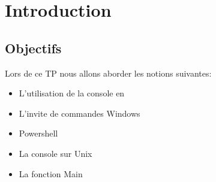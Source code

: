 \section{Introduction}

\subsection{Objectifs}
Lors de ce TP nous allons aborder les notions suivantes:\\

\begin{itemize}
  \item L'utilisation de la console en \csharp
  \item L'invite de commandes Windows
  \item Powershell
  \item La console sur Unix
  \item La fonction Main
\end{itemize}
